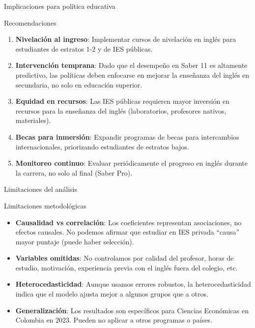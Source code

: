 \documentclass[aspectratio=169, 11pt]{beamer}
\begin{document}
\begin{frame}{Implicaciones para política educativa}
\begin{alertblock}{Recomendaciones}
\begin{enumerate}
\item \textbf{Nivelación al ingreso}: Implementar cursos de nivelación en inglés para estudiantes de estratos 1-2 y de IES públicas.

\item \textbf{Intervención temprana}: Dado que el desempeño en Saber 11 es altamente predictivo, las políticas deben enfocarse en mejorar la enseñanza del inglés en secundaria, no solo en educación superior.

\item \textbf{Equidad en recursos}: Las IES públicas requieren mayor inversión en recursos para la enseñanza del inglés (laboratorios, profesores nativos, materiales).

\item \textbf{Becas para inmersión}: Expandir programas de becas para intercambios internacionales, priorizando estudiantes de estratos bajos.

\item \textbf{Monitoreo continuo}: Evaluar periódicamente el progreso en inglés durante la carrera, no solo al final (Saber Pro).
\end{enumerate}
\end{alertblock}
\end{frame}

\begin{frame}{Limitaciones del análisis}
\begin{block}{Limitaciones metodológicas}
\begin{itemize}\setlength{\itemsep}{2pt}
\item \textbf{Causalidad vs correlación}: Los coeficientes representan asociaciones, no efectos causales. No podemos afirmar que estudiar en IES privada ``causa'' mayor puntaje (puede haber selección).

\item \textbf{Variables omitidas}: No controlamos por calidad del profesor, horas de estudio, motivación, experiencia previa con el inglés fuera del colegio, etc.

\item \textbf{Heterocedasticidad}: Aunque usamos errores robustos, la heterocedasticidad indica que el modelo ajusta mejor a algunos grupos que a otros.

\item \textbf{Generalización}: Los resultados son específicos para Ciencias Econ\'omicas en Colombia en 2023. Pueden no aplicar a otros programas o países.
\end{itemize}
\end{block}
\end{frame}
\end{document}
